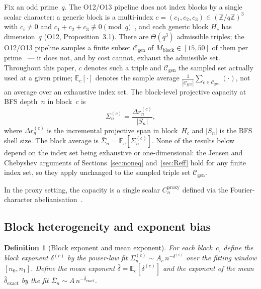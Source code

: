 \documentclass[11pt,a4paper]{article}
\newtheorem{definition}[theorem]{Definition}
\newcommand{\Sn}{\bar{\Sigma}_n}
\newcommand{\dexact}{\hat{\delta}_{\mathrm{exact}}}
\begin{document}
Fix an odd prime~$q$.
The O12/O13 pipeline does not index blocks by a single scalar character:
a generic block is a multi-index $c=(c_1,c_2,c_3)\in(\mathbb{Z}/q\mathbb{Z})^3$
with $c_i\neq0$ and $c_1+c_2+c_3\not\equiv0\pmod q$~\cite{Beau2026a16}, and
each generic block $H_c$ has dimension~$q$ (O12, Proposition~3.1).
There are $\Theta(q^3)$ admissible triples; the O12/O13 pipeline samples a
finite subset $\mathcal{C}_{\mathrm{gen}}$ of $M_{\mathrm{block}}\in[15,50]$
of them per prime~\cite{Beau2026a16,Beau2026a17} — it does not, and by cost
cannot, exhaust the admissible set.
Throughout this paper, $c$ denotes such a triple and $\mathcal{C}_{\mathrm{gen}}$
the sampled set actually used at a given prime; $\mathbb{E}_c[\cdot]$ denotes
the sample average $\frac{1}{|\mathcal{C}_{\mathrm{gen}}|}\sum_{c\in\mathcal{C}_{\mathrm{gen}}}(\cdot)$,
not an average over an exhaustive index set.
The block-level projective capacity at BFS depth~$n$ in block~$c$ is
\begin{equation}
\label{eq:blockcap}
\Sigma_n^{(c)} = \frac{\Delta r_n^{(c)}}{|S_n|},
\end{equation}
where $\Delta r_n^{(c)}$ is the incremental projective span in
block~$H_c$ and $|S_n|$ is the BFS shell size.
The block average is $\Sn = \mathbb{E}_c[\Sigma_n^{(c)}]$.
None of the results below depend on the index set being exhaustive or
one-dimensional: the Jensen and Chebyshev arguments of
Sections~\ref{sec:noneq} and~\ref{sec:Reff} hold for any finite index set,
so they apply unchanged to the sampled triple set $\mathcal{C}_{\mathrm{gen}}$.

In the proxy setting, the capacity is a single scalar
$C_n^{\mathrm{proxy}}$ defined via the Fourier-character
abelianisation~\cite{Beau2026a15}.

\subsection{Block heterogeneity and exponent bias}

\begin{definition}[Block exponent and mean exponent]
\label{def:exponents}
For each block~$c$, define the block exponent
$\delta^{(c)}$ by the power-law fit
$\Sigma_n^{(c)} \sim A_c \, n^{-\delta^{(c)}}$
over the fitting window $[n_0, n_1]$.
Define the mean exponent
$\bar{\delta} = \mathbb{E}_c[\delta^{(c)}]$
and the exponent of the mean
$\dexact$ by the fit
$\Sn \sim A \, n^{-\dexact}$.
\end{definition}
\end{document}
